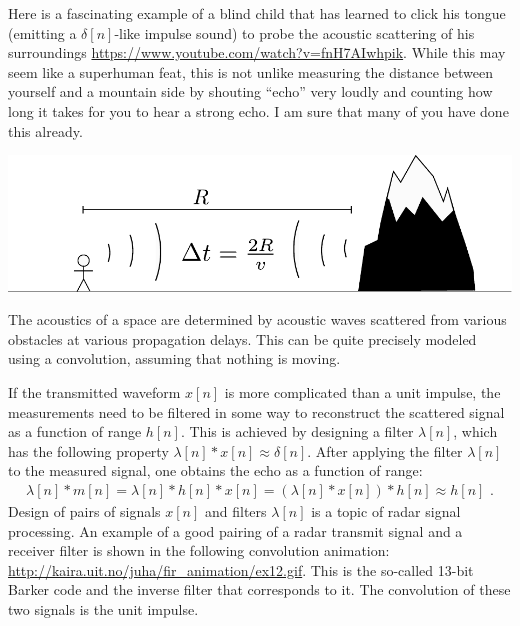 Here is a fascinating example of a blind child that has learned to
click his tongue (emitting a $\delta[n]$-like impulse sound) to probe the
acoustic scattering of his
surroundings \url{https://www.youtube.com/watch?v=fnH7AIwhpik}. While
this may seem like a superhuman feat, this is not unlike measuring the
distance between yourself and a mountain side by shouting ``echo''
very loudly and counting how long it takes for you to hear a strong
echo. I am sure that many of you have done this already.

\begin{marginfigure}
\begin{center}
\includegraphics[width=\textwidth]{Applications/figures/mountain_echo.pdf}
\end{center}
\caption{The acoustics of a space are determined by acoustic waves
scattered from various obstacles at various propagation delays. This
can be quite precisely modeled using a convolution, assuming that
nothing is moving.}
\end{marginfigure}

If the transmitted waveform $x[n]$ is more complicated than a unit
impulse, the measurements need to be filtered in some way to
reconstruct the scattered signal as a function of range $h[n]$. This
is achieved by designing a filter $\lambda[n]$, which has the
following property $\lambda[n]*x[n] \approx \delta[n]$. After applying
the filter $\lambda[n]$ to the measured signal, one obtains the echo
as a function of range:
\begin{align}
\lambda[n]*m[n] = \lambda[n]*h[n]*x[n] = (\lambda[n]*x[n])*h[n]\approx h[n]\,\,. 
\end{align}
Design of pairs of signals $x[n]$ and filters $\lambda[n]$ is a topic
of radar signal processing. An example of a good pairing of a radar
transmit signal and a receiver filter is shown in the following convolution animation:
\url{http://kaira.uit.no/juha/fir_animation/ex12.gif}.
This is the so-called 13-bit Barker code and the inverse filter that
corresponds to it. The convolution of these two signals is the unit
impulse.